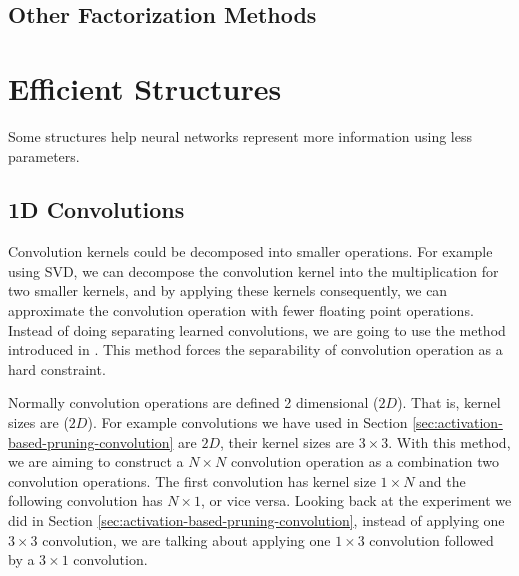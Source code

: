 \subsection{Other Factorization Methods}

\section{Efficient Structures}
Some structures help neural networks represent more information using less parameters.
\subsection{1D Convolutions}
Convolution kernels could be decomposed into smaller operations. For example using SVD, we can decompose the convolution kernel into the multiplication for two smaller kernels, and by applying these kernels consequently, we can approximate the convolution operation with fewer floating point operations. Instead of doing separating learned convolutions, we are going to use the method introduced in \cite{alvarez2016decomposeme}. This method forces the separability of convolution operation as a hard constraint. 

Normally convolution operations are defined 2 dimensional ($2D$). That is, kernel sizes are ($2D$). For example convolutions we have used in Section \ref{sec:activation-based-pruning-convolution} are $2D$, their kernel sizes are $3 \times 3$. With this method, we are aiming to construct a $N \times N$ convolution operation as a combination two convolution operations. The first convolution has kernel size $1 \times N$ and the following convolution has $N \times 1$, or vice versa. Looking back at the experiment we did in  Section \ref{sec:activation-based-pruning-convolution}, instead of applying one $3 \times 3$ convolution, we are talking about applying one $1 \times 3$ convolution followed by a $3 \times 1$ convolution. 

